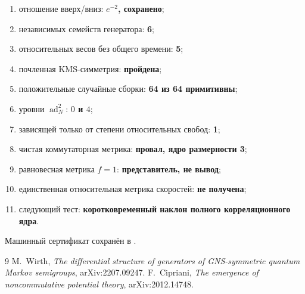 \begin{protocol}
\begin{enumerate}
 \item отношение вверх/вниз: \textbf{$e^{-2}$, сохранено};
 \item независимых семейств генератора: \textbf{6};
 \item относительных весов без общего времени: \textbf{5};
 \item почленная KMS-симметрия: \textbf{пройдена};
 \item положительные случайные сборки: \textbf{64 из 64 примитивны};
 \item уровни $\operatorname{ad}_N^2$: \textbf{$0$ и $4$};
 \item зависящей только от степени относительных свобод: \textbf{1};
 \item чистая коммутаторная метрика: \textbf{провал, ядро размерности 3};
 \item равновесная метрика $f=1$: \textbf{представитель, не вывод};
 \item единственная относительная метрика скоростей: \textbf{не получена};
 \item следующий тест: \textbf{коротковременный наклон полного
 корреляционного ядра}.
\end{enumerate}
\end{protocol}

Машинный сертификат сохранён в
.

\begin{thebibliography}{9}
M.~Wirth,
\emph{The differential structure of generators of GNS-symmetric quantum
Markov semigroups}, arXiv:2207.09247.
F.~Cipriani,
\emph{The emergence of noncommutative potential theory},
arXiv:2012.14748.
\end{thebibliography}